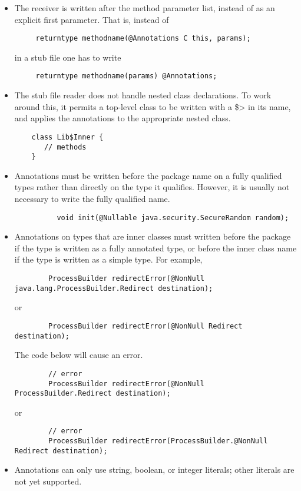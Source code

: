 \begin{itemize}

\item
  The receiver is written after the method parameter list, instead of as an
  explicit first parameter.  That is, instead of

\begin{Verbatim}
     returntype methodname(@Annotations C this, params);
\end{Verbatim}

\noindent
in a stub file one has to write

\begin{Verbatim}
     returntype methodname(params) @Annotations;
\end{Verbatim}

\item
  The stub file reader
  does not handle nested class declarations.  To work around this, it permits a
  top-level class to be written with a \<\$> in its name, and applies the
  annotations to the appropriate nested class.

\begin{Verbatim}
    class Lib$Inner {
       // methods
    }
\end{Verbatim}

\item
  Annotations must be written before the package name on a fully qualified
  types rather than directly on the type it qualifies.  However, it is usually not
  necessary to write the fully qualified name.

  \begin{Verbatim}
          void init(@Nullable java.security.SecureRandom random);
   \end{Verbatim}
\item
   Annotations on types that are inner classes must written before the
   package if the type is written as a
   fully annotated type, or before the inner class name if the type is
   written as a simple type. For example,

\begin{Verbatim}
        ProcessBuilder redirectError(@NonNull java.lang.ProcessBuilder.Redirect destination);
\end{Verbatim}
 or
\begin{Verbatim}
        ProcessBuilder redirectError(@NonNull Redirect destination);
\end{Verbatim}
   The code below will cause an error.
\begin{Verbatim}
        // error
        ProcessBuilder redirectError(@NonNull ProcessBuilder.Redirect destination);
\end{Verbatim}
 or
\begin{Verbatim}
        // error
        ProcessBuilder redirectError(ProcessBuilder.@NonNull Redirect destination);
\end{Verbatim}

\item
  Annotations can only use string, boolean, or integer literals; other literals are not
  yet supported.
\end{itemize}

